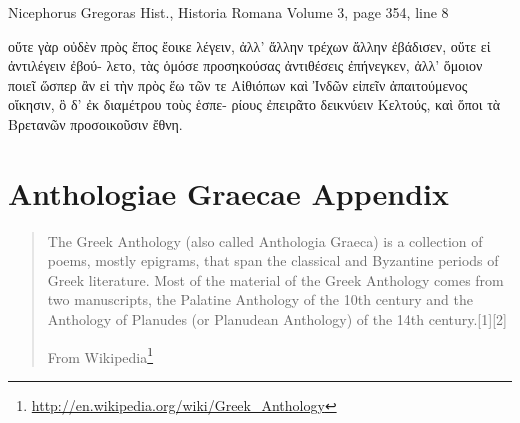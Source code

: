\documentclass[12pt,letterpaper,twoside,final]{memoir}
\begin{document}
\begin{greek}
Nicephorus Gregoras Hist., Historia Romana 
Volume 3, page 354, line 8

                     οὔτε γὰρ οὐδὲν πρὸς ἔπος ἔοικε λέγειν, 
ἀλλ' ἄλλην τρέχων ἄλλην ἐβάδισεν, οὔτε εἰ ἀντιλέγειν ἐβού-
λετο, τὰς ὁμόσε προσηκούσας ἀντιθέσεις ἐπήνεγκεν, ἀλλ' ὅμοιον 
ποιεῖ ὥσπερ ἂν εἰ τὴν πρὸς ἕω τῶν τε Αἰθιόπων καὶ Ἰνδῶν 
εἰπεῖν ἀπαιτούμενος οἴκησιν, ὃ δ' ἐκ διαμέτρου τοὺς ἑσπε-
ρίους ἐπειρᾶτο δεικνύειν Κελτούς, καὶ ὅποι τὰ Βρετανῶν 
προσοικοῦσιν ἔθνη. 
\end{greek}

\section{Anthologiae Graecae Appendix}%
\blockquote[From Wikipedia\footnote{\url{http://en.wikipedia.org/wiki/Greek_Anthology}}]{The Greek Anthology (also called Anthologia Graeca) is a collection of poems, mostly epigrams, that span the classical and Byzantine periods of Greek literature. Most of the material of the Greek Anthology comes from two manuscripts, the Palatine Anthology of the 10th century and the Anthology of Planudes (or Planudean Anthology) of the 14th century.[1][2]}
\end{document}
